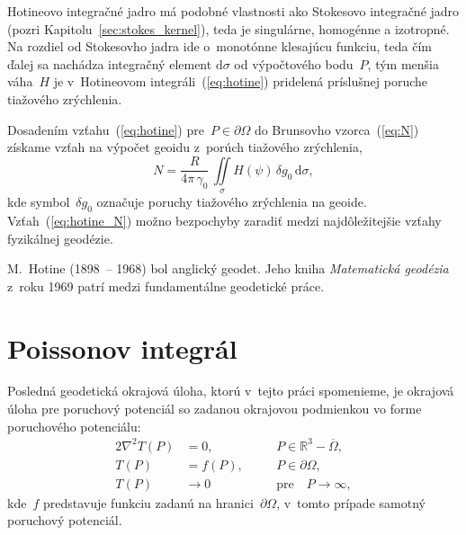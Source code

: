 \documentclass[a4paper, 12pt]{book}
\newcommand{\diff}{\mathrm d}
\begin{document}
Hotineovo integračné jadro má podobné vlastnosti ako Stokesovo integračné jadro 
(pozri Kapitolu~\ref{sec:stokes_kernel}), teda je singulárne, homogénne 
a izotropné.  Na rozdiel od Stokesovho jadra ide o~monotónne klesajúcu funkciu, 
teda čím ďalej sa nachádza integračný element $\diff\sigma$ od výpočtového 
bodu~$P$, tým menšia váha~$H$ je v~Hotineovom integráli~(\ref{eq:hotine}) 
pridelená príslušnej poruche tiažového zrýchlenia.

Dosadením vzťahu~(\ref{eq:hotine}) pre~$P \in \partial\Omega$ do Brunsovho 
vzorca~(\ref{eq:N}) získame vzťah na výpočet geoidu z~porúch tiažového 
zrýchlenia,
%
\begin{equation}
\label{eq:hotine_N}
N = \frac{R}{4\pi \, \gamma_0} \, \iint\limits_{\sigma} H(\psi) \, \delta g_0 
\, \diff \sigma{,}
\end{equation}
%
kde symbol~$\delta g_0$ označuje poruchy tiažového zrýchlenia na geoide.  
Vzťah~(\ref{eq:hotine_N}) možno bezpochyby zaradiť medzi najdôležitejšie vzťahy 
fyzikálnej geodézie.

M.~Hotine (1898~-- 1968) bol anglický geodet.  Jeho kniha \textit{Matematická 
geodézia} z~roku 1969 patrí medzi fundamentálne geodetické práce.

\section{Poissonov integrál}
\label{sec:poisson_integral}

Posledná geodetická okrajová úloha, ktorú v~tejto práci spomenieme, je okrajová 
úloha pre poruchový potenciál so zadanou okrajovou podmienkou vo forme 
poruchového potenciálu:
%
\begin{alignat}{2}
\nabla^2 T(P) &= 0{,} &&P \in \mathbb{R}^3 
- \overline\Omega{,}\label{eq:bvp_t_laplace}\\
T(P) &= f(P){,} \quad &&P \in 
\partial\Omega{,}\label{eq:bvp_t_boundary_condition}\\
T(P) &\rightarrow 0 &&\textrm{pre} \quad P \rightarrow 
\infty{,}\label{eq:bvp_t_t_infty}
\end{alignat}
%
kde~$f$ predstavuje funkciu zadanú na hranici~$\partial\Omega$, v~tomto prípade 
samotný poruchový potenciál.
\end{document}
